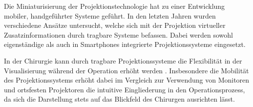 

\prever{
}

\prever{
}

Die Miniaturisierung der Projektionstechnologie hat zu einer Entwicklung mobiler, handgeführter Systeme geführt. In den letzten Jahren wurden verschiedene Ansätze untersucht, welche sich mit der Projektion virtueller Zusatzinformationen durch tragbare Systeme befassen. Dabei werden sowohl eigenständige als auch in Smartphones integrierte Projektionssysteme eingesetzt.\\

\prever{
}

In der Chirurgie kann durch tragbare Projektionssysteme die Flexibilität in der Visualisierung während der Operation erhöht werden \cite{Kobler2010} \cite{Gavaghan2012}. Insbesondere die Mobilität des Projektionssystems erhöht dabei im Vergleich zur Verwendung von Monitoren und ortsfesten Projektoren die intuitive Eingliederung in den Operationsprozess, da sich die Darstellung stets auf das Blickfeld des Chirurgen ausrichten lässt.\\

